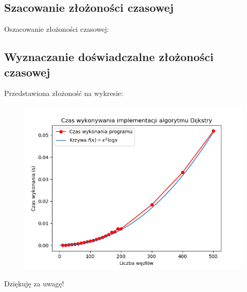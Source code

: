 \documentclass{beamer}
\begin{document}
\subsection{Szacowanie złożoności czasowej}
\begin{frame}
Oszacowanie złożoności czasowej:

\begin{figure}
\centering
{}
\end{figure}
\end{frame}

\subsection{Wyznaczanie doświadczalne złożoności czasowej}
\begin{frame}

	Przedstawiona złożoność na wykresie:

	\begin{figure}
\centering
\includegraphics[width=0.8\linewidth]{plot.png}
	\end{figure}

\end{frame}

\begin{frame}
	\Huge\center
	Dziękuję za uwagę!
\end{frame}
\end{document}
